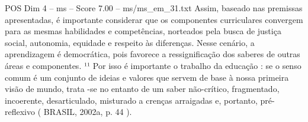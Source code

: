 \begin{textsample}{POS Dim 4 – ms – Score 7.00 – ms/ms\_em\_31.txt}
Assim, baseado nas premissas apresentadas, é importante considerar que os componentes curriculares convergem para as mesmas habilidades e competências, norteados pela busca de justiça social, autonomia, equidade e respeito às diferenças.
Nesse cenário, a aprendizagem é democrática, pois favorece a ressignificação dos saberes de outras áreas e componentes. ¹¹ Por isso é importante o trabalho da educação : se o senso comum é um conjunto de ideias e valores que servem de base à nossa primeira visão de mundo, trata -se no entanto de um saber não-crítico, fragmentado, incoerente, desarticulado, misturado a crenças arraigadas e, portanto, pré-reflexivo ( BRASIL, 2002a, p. 44 ).

\end{textsample}
